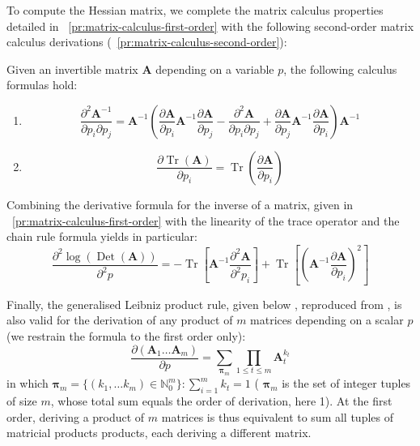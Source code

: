 \documentclass[long, final]{jobim}
\DeclareMathOperator*{\Tr}{Tr}
\DeclareMathOperator*{\DET}{Det}
\begin{document}
To compute the Hessian matrix, we complete the matrix calculus properties detailed in \propertyname~\ref{pr:matrix-calculus-first-order} with the following second-order matrix calculus derivations (\propertyname~\ref{pr:matrix-calculus-second-order}):

\begin{property}
\label{pr:matrix-calculus-second-order}
Given an invertible matrix $\boldsymbol{A}$ depending on a variable $p$, the following calculus formulas hold:
\begin{multicols}{2}
\begin{enumerate}[label=(\alph*)]
\item 
$$ \frac{\partial^2 \boldsymbol{A}^{-1}}{\partial p_i \partial p_j} =  \boldsymbol{A}^{-1} \left( \frac{\partial \boldsymbol{A}}{\partial p_i } \boldsymbol{A}^{-1} \frac{\partial \boldsymbol{A}}{\partial p_j} - \frac{\partial^2 \boldsymbol{A}}{\partial p_i \partial p_j}  + \frac{\partial \boldsymbol{A}}{\partial p_j } \boldsymbol{A}^{-1} \frac{\partial \boldsymbol{A}}{\partial p_i}\right) \boldsymbol{A}^{-1}
$$
\item 
$$
\frac{\partial \Tr \left(\boldsymbol{A}\right)}{\partial p_i} = \Tr  \left(\frac{\partial \boldsymbol{A}}{\partial p_i}\right)
$$


\end{enumerate}
\end{multicols}

Combining the derivative formula for the inverse of a matrix, given in \propertyname~\ref{pr:matrix-calculus-first-order} with the linearity of the trace operator and the chain rule formula yields in particular:
\begin{equation*}
    \frac{\partial^2 \log \left(\DET (\boldsymbol{A})\right)}{\partial^2 p} = - \Tr  \left[\boldsymbol{A}^{-1}\frac{\partial^2 \boldsymbol{A}}{\partial^2 p_i}\right] +
\Tr  \left[\left(\boldsymbol{A}^{-1}\frac{\partial \boldsymbol{A}}{\partial p_i}\right)^2\right]
\end{equation*}


Finally, the generalised Leibniz product rule, given below , reproduced from \cite{mulla20}, is also valid for the derivation of any product of $m$ matrices depending on a scalar $p$ (we restrain the formula to the first order only): 
\begin{equation*}
    \frac{\partial (\boldsymbol{A}_1 \ldots \boldsymbol{A}_m)}{\partial p} = \sum_{\boldsymbol{\pi}_m} \prod_{1\leq t \leq m}  \boldsymbol{A}_t^{k_t}
\end{equation*}
in which $\boldsymbol{\pi}_m = \{(k_1, \ldots k_m) \in \mathbb{N}_0^m \}: \sum_{i=1}^m k_t = 1$ ( $\boldsymbol{\pi}_m$ is the set of integer tuples of size $m$, whose total sum equals the order of derivation, here 1). At the first order, deriving a product of $m$ matrices is thus equivalent to sum all tuples of matricial products products, each deriving a different matrix. 
\end{property}
\end{document}
